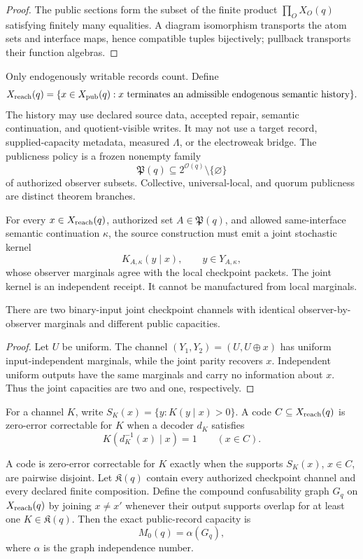 \begin{proof}
The public sections form the subset of the finite product
\(\prod_OX_O(q)\) satisfying finitely many equalities. A diagram isomorphism
transports the atom sets and interface maps, hence compatible tuples
bijectively; pullback transports their function algebras.
\end{proof}

Only endogenously writable records count. Define
\[
X_{\rm reach}(q)=
\{x\in X_{\rm pub}(q):x\text{ terminates an admissible endogenous semantic history}\}.
\]
The history may use declared source data, accepted repair, semantic
continuation, and quotient-visible writes. It may not use a target record,
supplied-capacity metadata, measured \(\Lambda\), or the electroweak bridge.
The publicness policy is a frozen nonempty family
\[
\mathfrak P(q)\subseteq2^{\mathcal O(q)}\setminus\{\varnothing\}
\]
of authorized observer subsets. Collective, universal-local, and quorum
publicness are distinct theorem branches.

For every \(x\in X_{\rm reach}(q)\), authorized set
\(A\in\mathfrak P(q)\), and allowed same-interface semantic continuation
\(\kappa\), the source construction must emit a joint stochastic kernel
\[
K_{A,\kappa}(y\mid x),
\qquad y\in Y_{A,\kappa},
\]
whose observer marginals agree with the local checkpoint packets. The joint
kernel is an independent receipt. It cannot be manufactured from local
marginals.

\begin{theorem}
\label{thm:local-marginal-capacity-nogo}
There are two binary-input joint checkpoint channels with identical
observer-by-observer marginals and different public capacities.
\end{theorem}

\begin{proof}
Let \(U\) be uniform. The channel
\((Y_1,Y_2)=(U,U\oplus x)\) has uniform input-independent marginals, while
the joint parity recovers \(x\). Independent uniform outputs have the same
marginals and carry no information about \(x\). Thus the joint capacities are
two and one, respectively.
\end{proof}

For a channel \(K\), write
\(S_K(x)=\{y:K(y\mid x)>0\}\). A code
\(C\subseteq X_{\rm reach}(q)\) is zero-error correctable for \(K\) when a
decoder \(d_K\) satisfies
\[
K(d_K^{-1}(x)\mid x)=1
\qquad(x\in C).
\]

\begin{theorem}
\label{thm:compound-public-capacity}
A code is zero-error correctable for \(K\) exactly when the supports
\(S_K(x)\), \(x\in C\), are pairwise disjoint. Let \(\mathfrak K(q)\)
contain every authorized checkpoint channel and every declared finite
composition. Define the compound confusability graph \(G_q\) on
\(X_{\rm reach}(q)\) by joining \(x\ne x'\) whenever their output supports
overlap for at least one \(K\in\mathfrak K(q)\). Then the exact public-record
capacity is
\[
\boxed{M_0(q)=\alpha(G_q)},
\]
where \(\alpha\) is the graph independence number.
\end{theorem}

